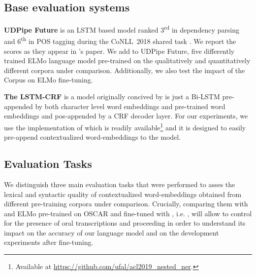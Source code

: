 
\subsection{Base evaluation systems}

\textbf{UDPipe Future} \citep{straka-2018-udpipe} is an LSTM based model ranked 3\textsuperscript{rd} in dependency parsing and 6\textsuperscript{th} in POS tagging during the CoNLL~2018 shared task \citep{seker-etal-2018-universal}. We report the scores as they appear in \citet{kondratyuk-straka-2019-75}'s paper.
We add to UDPipe Future, five differently trained ELMo language model pre-trained on the qualitatively and quantitatively different corpora under comparison. Additionally, we also test the impact of the \Cabernet Corpus on ELMo fine-tuning.

\textbf{The LSTM-CRF} is a model originally concived by \citet{lample-etal-2016-neural} is just a Bi-LSTM pre-appended by both character level word embeddings and pre-trained word embeddings and pos-appended by a CRF decoder layer. For our experiments, we use the implementation of \citep{strakova-etal-2019-neural} which is readily available\footnote{Available at \url{https://github.com/ufal/acl2019_nested_ner}.} and it is designed to easily pre-append contextualized word-embeddings to the model.

\subsection{Evaluation Tasks}\label{MethodEVAL}

We distinguish three main evaluation tasks that were performed
to asses the lexical and syntactic quality of contextualized word-embeddings obtained from different pre-training corpora under comparison.%
Crucially, comparing them with and ELMo pre-trained on OSCAR and fine-tuned with \Cabernet, i.e. \ELMocoscar, will allow to control for  the presence of oral transcriptions and proceeding in order to understand its impact on the accuracy of our language model and on the development experiments after fine-tuning.%

